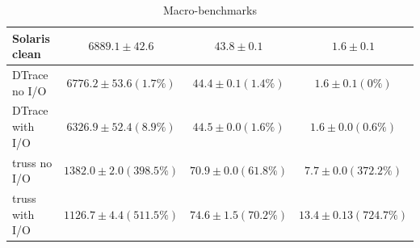 \begin{table}[ht]
\begin{tabular}{ | l || c | c | c | }
\hline\hline
Solaris clean & \begin{math} 6889.1\pm42.6 \end{math} & \begin{math} 43.8\pm0.1 \end{math} & \begin{math} 1.6\pm0.1 \end{math} \\
\hline
DTrace no I/O & \begin{math} 6776.2\pm53.6 (1.7\%) \end{math} & \begin{math} 44.4\pm0.1 (1.4\%) \end{math} & \begin{math} 1.6\pm0.1 (0\%) \end{math} \\
\hline
DTrace with I/O & \begin{math} 6326.9\pm52.4 (8.9\%) \end{math} & \begin{math} 44.5\pm0.0 (1.6\%) \end{math} & \begin{math} 1.6\pm0.0 (0.6\%) \end{math} \\
\hline
truss no I/O & \begin{math} 1382.0\pm2.0 (398.5\%) \end{math} & \begin{math} 70.9\pm0.0 (61.8\%) \end{math} & \begin{math} 7.7\pm0.0 (372.2\%) \end{math} \\
\hline
truss with I/O & \begin{math} 1126.7\pm4.4 (511.5\%) \end{math} & \begin{math} 74.6\pm1.5 (70.2\%) \end{math} & \begin{math} 13.4\pm0.13 (724.7\%) \end{math} \\
\hline
\end{tabular}
\caption{Macro-benchmarks}
\label{tab-macro}
\end{table}

